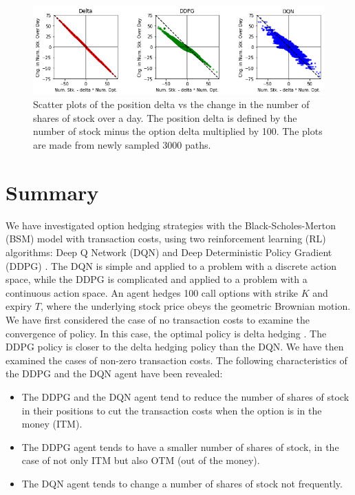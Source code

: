 \documentclass[11pt]{article}
\begin{document}
\begin{figure}[tb]
	\begin{center}
		\includegraphics[width=15cm]{../fig/fig09.png}
		\caption{Scatter plots of the position delta vs the change in the number of shares of stock over a day. The position delta is defined by the number of stock minus the option delta multiplied by 100. The plots are made from newly sampled 3000 paths.}
		\label{fig09}
	\end{center}
\end{figure}


\section{Summary}

We have investigated option hedging strategies with the Black-Scholes-Merton (BSM) model with transaction costs, using two reinforcement learning (RL) algorithms: Deep Q Network (DQN) \citep{Watkins:Dayan:1992, Mnih:etal:2013} and Deep Deterministic Policy Gradient (DDPG) \citep{Silver:etal:2014, Lillicrap:etal:2015}. The DQN is simple and applied to a problem with a discrete action space, while the DDPG is complicated and applied to a problem with a continuous action space. An agent hedges 100 call options with strike $K$ and expiry $T$, where the underlying stock price obeys the geometric Brownian motion. We have first considered the case of no transaction costs to examine the convergence of policy. In this case, the optimal policy is delta hedging \citep{Kolm:Ritter:2019}. The DDPG policy is closer to the delta hedging policy than the DQN. We have then examined the cases of non-zero transaction costs. The following characteristics of the DDPG and the DQN agent have been revealed:
%
\begin{itemize}
	\item The DDPG and the DQN agent tend to reduce the number of shares of stock in their positions to cut the transaction costs when the option is in the money (ITM).
	\item The DDPG agent tends to have a smaller number of shares of stock, in the case of not only ITM but also OTM (out of the money).
	\item The DQN agent tends to change a number of shares of stock not frequently.
\end{itemize}
\end{document}
